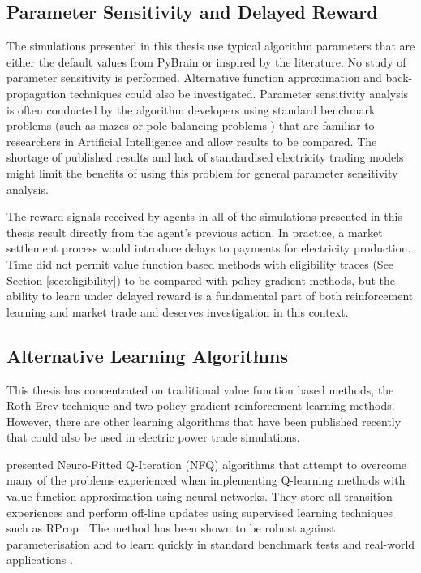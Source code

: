 \subsection{Parameter Sensitivity and Delayed Reward}
The simulations presented in this thesis use typical algorithm parameters that
are either the default values from PyBrain or inspired by the literature. No
study of parameter sensitivity is performed.  Alternative function approximation
and back-propagation techniques could also be investigated. Parameter
sensitivity analysis is often conducted by the algorithm developers using
standard benchmark problems (such as mazes or pole balancing problems
\cite{schaul:2010}) that are familiar to researchers in Artificial Intelligence
and allow results to be compared. The shortage of published results and lack of
standardised electricity trading models might limit the benefits of using this
problem for general parameter sensitivity analysis.

The reward signals received by agents in all of the simulations presented in
this thesis result directly from the agent's previous action.  In
practice, a market settlement process would introduce delays to payments for
electricity production. Time did not permit value function based methods with
eligibility traces (See Section \ref{sec:eligibility}) to be compared with
policy gradient methods, but the ability to learn under delayed reward is a
fundamental part of both reinforcement learning and market trade and deserves
investigation in this context.


\subsection{Alternative Learning Algorithms}
This thesis has concentrated on traditional value function based methods, the
Roth-Erev technique and two policy gradient reinforcement learning methods.
However, there are other learning algorithms that have been published recently
that could also be used in electric power trade simulations.

 presented Neuro-Fitted Q-Iteration (NFQ)
algorithms that attempt to overcome many of the problems experienced when implementing
Q-learning methods with value function approximation using neural networks.
They store all transition experiences and perform off-line updates using
supervised learning techniques such as RProp \cite{riedmiller93}.  The method
has been shown to be robust against parameterisation and to learn quickly in
standard benchmark tests and real-world applications \cite{kietzmann09}.

